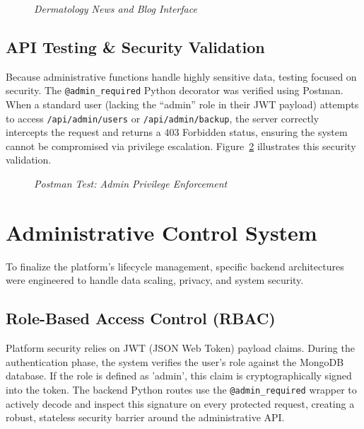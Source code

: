 \begin{figure}[H]
	\centering
	\caption{\textit{Dermatology News and Blog Interface}}
	\label{fig:ui_blog_admin}
\end{figure}

\subsection{API Testing \& Security Validation}
Because administrative functions handle highly sensitive data, testing focused on security. The \texttt{@admin\_required} Python decorator was verified using Postman. When a standard user (lacking the ``admin'' role in their JWT payload) attempts to access \texttt{/api/admin/users} or \texttt{/api/admin/backup}, the server correctly intercepts the request and returns a 403 Forbidden status, ensuring the system cannot be compromised via privilege escalation. Figure~\ref{fig:api_admin} illustrates this security validation.

\begin{figure}[H]
	\centering
	\caption{\textit{Postman Test: Admin Privilege Enforcement}}
	\label{fig:api_admin}
\end{figure}

\section{Administrative Control System}
To finalize the platform's lifecycle management, specific backend architectures were engineered to handle data scaling, privacy, and system security.

\subsection{Role-Based Access Control (RBAC)}
Platform security relies on JWT (JSON Web Token) payload claims. During the authentication phase, the system verifies the user's role against the MongoDB database. If the role is defined as 'admin', this claim is cryptographically signed into the token. The backend Python routes use the \texttt{@admin\_required} wrapper to actively decode and inspect this signature on every protected request, creating a robust, stateless security barrier around the administrative API.

